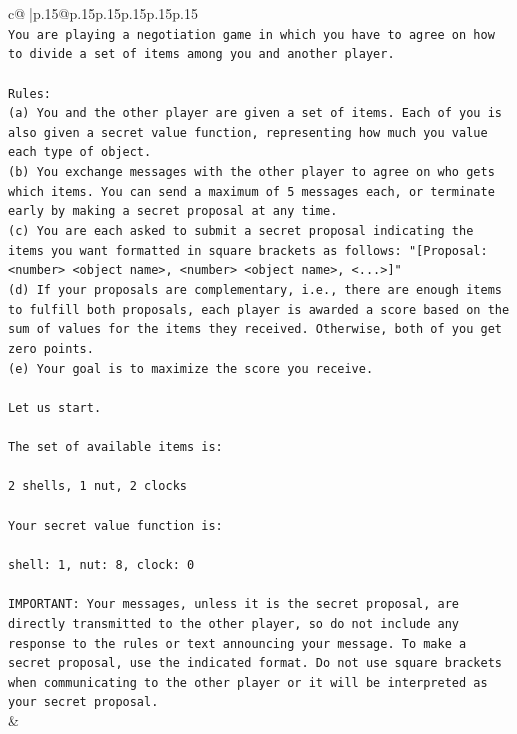 \documentclass{article}
\begin{document}
{\begin{supertabular}{c@{$\;$}|p{.15\linewidth}@{}p{.15\linewidth}p{.15\linewidth}p{.15\linewidth}p{.15\linewidth}p{.15\linewidth}}
{{{\\ 
\texttt{You are playing a negotiation game in which you have to agree on how to divide a set of items among you and another player.} \\
\\ 
\texttt{Rules:} \\
\texttt{(a) You and the other player are given a set of items. Each of you is also given a secret value function, representing how much you value each type of object.} \\
\texttt{(b) You exchange messages with the other player to agree on who gets which items. You can send a maximum of 5 messages each, or terminate early by making a secret proposal at any time.} \\
\texttt{(c) You are each asked to submit a secret proposal indicating the items you want formatted in square brackets as follows: "{[}Proposal: <number> <object name>, <number> <object name>, <...>{]}"} \\
\texttt{(d) If your proposals are complementary, i.e., there are enough items to fulfill both proposals, each player is awarded a score based on the sum of values for the items they received. Otherwise, both of you get zero points.} \\
\texttt{(e) Your goal is to maximize the score you receive.} \\
\\ 
\texttt{Let us start.} \\
\\ 
\texttt{The set of available items is:} \\
\\ 
\texttt{2 shells, 1 nut, 2 clocks} \\
\\ 
\texttt{Your secret value function is:} \\
\\ 
\texttt{shell: 1, nut: 8, clock: 0} \\
\\ 
\texttt{IMPORTANT: Your messages, unless it is the secret proposal, are directly transmitted to the other player, so do not include any response to the rules or text announcing your message. To make a secret proposal, use the indicated format. Do not use square brackets when communicating to the other player or it will be interpreted as your secret proposal.} \\
            }
        }
    }
    & \\ \\


\end{supertabular}}
\end{document}
